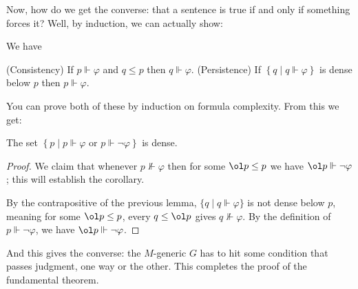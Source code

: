Now, how do we get the converse: that a sentence is true if and only if something forces it?
Well, by induction, we can actually show:
\begin{lemma}
	We have
	\begin{enumerate}[(1)]
		\ii (Consistency) If $p \Vdash \varphi$ and $q \le p$ then $q \Vdash \varphi$.
		\ii (Persistence) If $\left\{ q \mid q \Vdash \varphi \right\}$
		is dense below $p$ then $p \Vdash \varphi$.
	\end{enumerate}
\end{lemma}
You can prove both of these by induction on formula complexity.
From this we get:
\begin{corollary}[Completeness]
	The set $\left\{ p \mid p \Vdash \varphi \text{ or } p \Vdash \neg\varphi \right\}$
	is dense.
\end{corollary}
\begin{proof}
	We claim that whenever $p \not\Vdash \varphi$ then
	for some $\ol p \le p$ we have $\ol p \Vdash \neg\varphi$;
	this will establish the corollary.

	By the contrapositive of the previous lemma,
	$\{q \mid q \Vdash \varphi\}$ is not dense below $p$,
	meaning for some $\ol p \le p$, every $q \le \ol p$ gives $q \not\Vdash \varphi$.
	By the definition of $p \Vdash \neg\varphi$,
	we have $\ol p \Vdash \neg\varphi$.
\end{proof}
And this gives the converse: the $M$-generic $G$ has to hit some condition
that passes judgment, one way or the other.
This completes the proof of the fundamental theorem.


